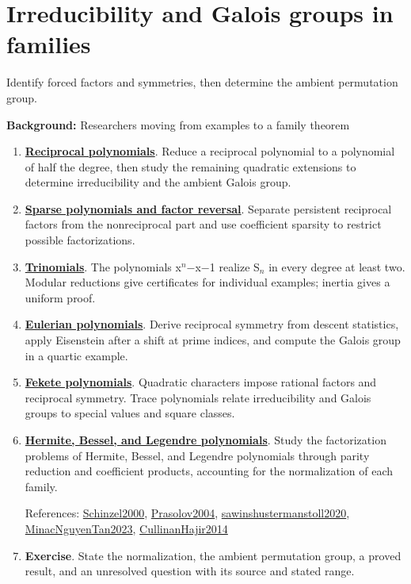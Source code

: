 \documentclass[11pt,a4paper,oneside,openany]{book}
\begin{document}
\section*{Irreducibility and Galois groups in families}
Identify forced factors and symmetries, then determine the ambient permutation group.\par
\textbf{Background:} Researchers moving from examples to a family theorem\par
\begin{enumerate}
\item \textbf{\hyperlink{article:reciprocity}{Reciprocal polynomials}}. Reduce a reciprocal polynomial to a polynomial of half the degree, then study the remaining quadratic extensions to determine irreducibility and the ambient Galois group.\par
\item \textbf{\hyperlink{article:sparse-gaps}{Sparse polynomials and factor reversal}}. Separate persistent reciprocal factors from the nonreciprocal part and use coefficient sparsity to restrict possible factorizations.\par
\item \textbf{\hyperlink{article:trinomials}{Trinomials}}. The polynomials x\ensuremath{{}^n}\ensuremath{-}x\ensuremath{-}1 realize S\ensuremath{{}_n} in every degree at least two. Modular reductions give certificates for individual examples; inertia gives a uniform proof.\par
\item \textbf{\hyperlink{article:eulerian}{Eulerian polynomials}}. Derive reciprocal symmetry from descent statistics, apply Eisenstein after a shift at prime indices, and compute the Galois group in a quartic example.\par
\item \textbf{\hyperlink{article:fekete}{Fekete polynomials}}. Quadratic characters impose rational factors and reciprocal symmetry. Trace polynomials relate irreducibility and Galois groups to special values and square classes.\par
\item \textbf{\hyperlink{article:orthogonal-families}{Hermite, Bessel, and Legendre polynomials}}. Study the factorization problems of Hermite, Bessel, and Legendre polynomials through parity reduction and coefficient products, accounting for the normalization of each family.\par
{\footnotesize References: \hyperlink{ref:Schinzel2000}{Schinzel2000}, \hyperlink{ref:Prasolov2004}{Prasolov2004}, \hyperlink{ref:sawinshustermanstoll2020}{sawinshustermanstoll2020}, \hyperlink{ref:MinacNguyenTan2023}{MinacNguyenTan2023}, \hyperlink{ref:CullinanHajir2014}{CullinanHajir2014}}\par
\item \textbf{Exercise}. State the normalization, the ambient permutation group, a proved result, and an unresolved question with its source and stated range.\par
\end{enumerate}
\end{document}
